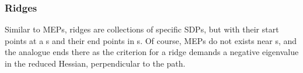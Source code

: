 
\subsubsection{Ridges}

Similar to MEPs, ridges are collections of specific SDPs, but with their start points at a s and their end points in s.
Of course, MEPs do not exists near s, and the analogue ends there as the criterion for a ridge demands a negative eigenvalue in the reduced Hessian, perpendicular to the path.
